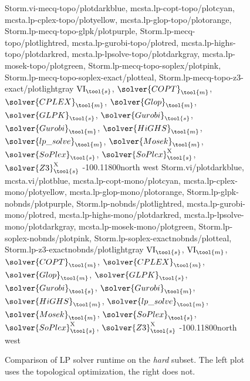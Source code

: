 \begin{figure*}[h]
	\centering
	{
		{Storm.vi-mecq-topo/plotdarkblue, mcsta.lp-copt-topo/plotcyan, mcsta.lp-cplex-topo/plotyellow, mcsta.lp-glop-topo/plotorange, Storm.lp-mecq-topo-glpk/plotpurple, Storm.lp-mecq-topo/plotlightred, mcsta.lp-gurobi-topo/plotred, mcsta.lp-highs-topo/plotdarkred, mcsta.lp-lpsolve-topo/plotdarkgray, mcsta.lp-mosek-topo/plotgreen, Storm.lp-mecq-topo-soplex/plotpink, Storm.lp-mecq-topo-soplex-exact/plotteal, Storm.lp-mecq-topo-z3-exact/plotlightgray}
		{$\text{VI}_\tool{s}$, $\solver{COPT}_\tool{m}$, $\solver{CPLEX}_\tool{m}$, $\solver{Glop}_\tool{m}$, $\solver{GLPK}_\tool{s}$, $\solver{Gurobi}_\tool{s}$, $\solver{Gurobi}_\tool{m}$, $\solver{HiGHS}_\tool{m}$, $\solver{lp\_solve}_\tool{m}$, $\solver{Mosek}_\tool{m}$, $\solver{SoPlex}_\tool{s}$, $\solver{SoPlex}_\tool{s}^\mathrm{X}$, $\solver{Z3}_\tool{s}^\mathrm{X}$}
		{-10}{\numqvbshard}{0.1}{1800}{north west}
	}
	{
		{Storm.vi/plotdarkblue, mcsta.vi/plotblue, mcsta.lp-copt-mono/plotcyan, mcsta.lp-cplex-mono/plotyellow, mcsta.lp-glop-mono/plotorange, Storm.lp-glpk-nobnds/plotpurple, Storm.lp-nobnds/plotlightred, mcsta.lp-gurobi-mono/plotred, mcsta.lp-highs-mono/plotdarkred, mcsta.lp-lpsolve-mono/plotdarkgray, mcsta.lp-mosek-mono/plotgreen, Storm.lp-soplex-nobnds/plotpink, Storm.lp-soplex-exactnobnds/plotteal, Storm.lp-z3-exactnobnds/plotlightgray}
		{$\text{VI}_\tool{s}$, $\text{VI}_\tool{m}$, $\solver{COPT}_\tool{m}$, $\solver{CPLEX}_\tool{m}$, $\solver{Glop}_\tool{m}$, $\solver{GLPK}_\tool{s}$, $\solver{Gurobi}_\tool{s}$, $\solver{Gurobi}_\tool{m}$, $\solver{HiGHS}_\tool{m}$, $\solver{lp\_solve}_\tool{m}$, $\solver{Mosek}_\tool{m}$, $\solver{SoPlex}_\tool{s}$, $\solver{SoPlex}_\tool{s}^\mathrm{X}$, $\solver{Z3}_\tool{s}^\mathrm{X}$}
		{-10}{\numqvbshard}{0.1}{1800}{north west}
	}
	\caption{Comparison of LP solver runtime on the \emph{hard} subset. The left plot uses the topological optimization, the right does not.}
	\label{fig:hard-LP-solvers}
\end{figure*}